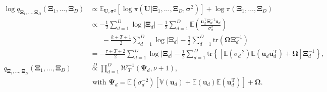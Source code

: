 \documentclass[a4paper,hidelinks]{article}\usepackage[]{graphicx}\usepackage[]{color}
\newcommand{\bsigma}{\bm{\sigma}}
\newcommand{\0}{\bm{0}}
\newcommand{\E}{\mathbb{E}}
\newcommand{\V}{\mathbb{V}}
\newcommand{\tr}{^{\text{T}}}
\newcommand{\trace}{\text{tr}}
\renewcommand{\(}{\left(}
\renewcommand{\)}{\right)}
\renewcommand{\[}{\left[}
\renewcommand{\]}{\right]}
\begin{document}
\begin{appendix}
		\begin{align*}
		\log q_{\bm{\Xi}_1, \dots, \bm{\Xi}_D}(\bm{\Xi}_1, \dots, \bm{\Xi}_D) & \propto \E_{\mathbf{U}, \bm{\sigma}^2} [\log \pi (\mathbf{U} | \bm{\Xi}_1, \dots, \bm{\Xi}_D, \bsigma^2)] + \log \pi (\bm{\Xi}_1, \dots, \bm{\Xi}_D) \\
		& \propto -\frac{1}{2} \sum_{d=1}^D \log |\bm{\Xi}_d| - \frac{1}{2} \sum_{d=1}^D \E \(\frac{\mathbf{u}_d \tr \bm{\Xi}_d^{-1} \mathbf{u}_d}{\sigma_d^2} \) \\
		& \,\,\,\,\,\,\,\,\,\, - \frac{k + T + 1}{2} \sum_{d=1}^D \log |\bm{\Xi}_d| - \frac{1}{2} \sum_{d=1}^D \trace (\bm{\Omega} \bm{\Xi}_d^{-1}) \\
		& = -\frac{\tau + T + 2}{2} \sum_{d=1}^D \log |\bm{\Xi}_d| - \frac{1}{2} \sum_{d=1}^D \trace \left\{ \[\E(\sigma_d^{-2}) \E( \mathbf{u}_d \mathbf{u}_d \tr) + \bm{\Omega}\] \bm{\Xi}_d^{-1} \right\}, \\
		q_{\bm{\Xi}_1, \dots, \bm{\Xi}_D}(\bm{\Xi}_1, \dots, \bm{\Xi}_D) & \overset{D}{\propto} \prod_{d=1}^D \mathcal{W}_T^{-1} (\bm{\Psi}_d, \nu + 1),  \\ 
		& \text{ with } \bm{\Psi}_d =\E(\sigma^{-2}_d) \[\V(\mathbf{u}_d) + \E(\mathbf{u}_d) \E( \mathbf{u}_d \tr) \] + \bm{\Omega}.
		\end{align*}
		
		

\end{appendix}
\end{document}
